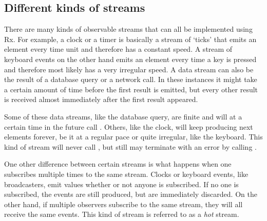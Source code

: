 \subsection{Different kinds of streams}
\label{subsec:stream-kinds}
There are many kinds of observable streams that can all be implemented using Rx. For example, a clock or a timer is basically a stream of `ticks' that emits an element every time unit and therefore has a constant speed. A stream of keyboard events on the other hand emits an element every time a key is pressed and therefore most likely has a very irregular speed. A data stream can also be the result of a database query or a network call. In these instances it might take a certain amount of time before the first result is emitted, but every other result is received almost immediately after the first result appeared.

Some of these data streams, like the database query, are finite and will at a certain time in the future call . Others, like the clock, will keep producing next elements forever, be it at a regular pace or quite irregular, like the keyboard. This kind of stream will never call , but still may terminate with an error by calling .


One other difference between certain streams is what happens when one subscribes multiple times to the same stream. Clocks or keyboard events, like broadcasters, emit values whether or not anyone is subscribed. If no one is subscribed, the events are still produced, but are immediately discarded. On the other hand, if multiple observers subscribe to the same stream, they will all receive the same events. This kind of stream is referred to as a \textit{hot} stream.

